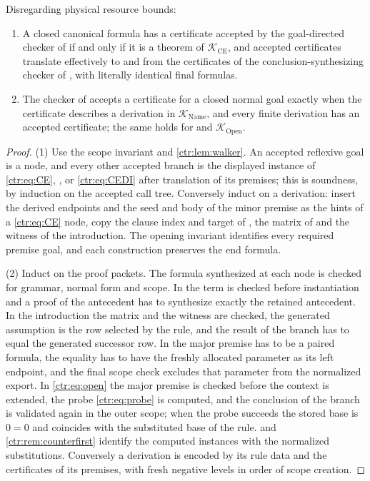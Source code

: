 \begin{proposition}\label{ctr:prop:checkers}
Disregarding physical resource bounds:
\begin{enumerate}
\item A closed canonical formula has a certificate accepted by the goal-directed checker of
 if and only if it is a theorem of $\mathcal K_{\mathrm{CE}}$, and
accepted certificates translate effectively to and from the certificates of the
conclusion-synthesizing checker of , with literally identical final
formulas.
\item The checker of  accepts a certificate for a closed normal goal
exactly when the certificate describes a derivation in $\mathcal K_{\mathrm{Name}}$, and
every finite derivation has an accepted certificate; the same holds for
 and $\mathcal K_{\mathrm{Open}}$.
\end{enumerate}
\end{proposition}
\begin{proof}
(1) Use the scope invariant and \cref{ctr:lem:walker}. An accepted reflexive goal is a
 node, and every other accepted branch is the displayed instance of
\eqref{ctr:eq:CE}, ,  or \eqref{ctr:eq:CEDI} after translation of
its premises; this is soundness, by induction on the accepted call tree. Conversely induct
on a derivation: insert the derived endpoints and the seed and body of the minor premise as
the hints of a \eqref{ctr:eq:CE} node, copy the clause index and target of ,
the matrix of  and the witness of the introduction. The opening invariant
identifies every required premise goal, and each construction preserves the end formula.

(2) Induct on the proof packets. The formula synthesized at each node is checked for
grammar, normal form and scope. In  the term is checked before instantiation
and a proof of the antecedent has to synthesize exactly the retained antecedent. In the
introduction the matrix and the witness are checked, the generated assumption is the row
selected by the rule, and the result of the branch has to equal the generated successor
row. In  the major premise has to be a paired formula, the equality has to
have the freshly allocated parameter as its left endpoint, and the final scope check
excludes that parameter from the normalized export. In \eqref{ctr:eq:open} the major premise
is checked before the context is extended, the probe \eqref{ctr:eq:probe} is computed, and
the conclusion of the branch is validated again in the outer scope; when the probe
succeeds the stored base is $0=0$ and coincides with the substituted base of the rule.
 and \cref{ctr:rem:counterfirst} identify the computed instances with the
normalized substitutions. Conversely a derivation is encoded by its rule data and the
certificates of its premises, with fresh negative levels in order of scope creation.
\end{proof}

